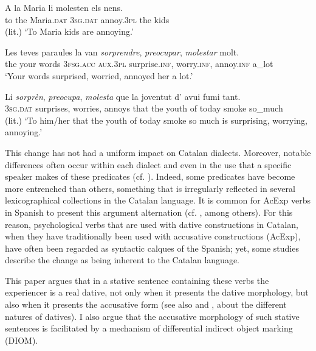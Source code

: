 \documentclass[output=paper,colorlinks,citecolor=brown,modfonts,nonflat]{langsci/langscibook}
\begin{document}
 \ex \label{ex:royo:1b}
 \gll A la Maria li molesten els nens.\\
 to the Maria.\textsc{dat} \textsc{3sg.dat} annoy.\textsc{3pl} the kids\\
 \glt  (lit.) ‘To Maria kids are annoying.’
 \z
 \z
 
\ea%
 \label{ex:royo:2} \citealt[77]{CabréMateu1998}
 \ea \label{ex:royo:2a}
 \gll Les teves paraules la van \emph{sorprendre}, \emph{preocupar}, \emph{molestar} molt.\\
the  your words     \textsc{3fsg.acc} \textsc{aux.3pl} surprise.\textsc{inf}, worry.\textsc{inf},  annoy.\textsc{inf} a\_lot\\
 \glt ‘Your words surprised, worried, annoyed her a lot.’ 
 
 \ex \label{ex:royo:2b}
 \gll Li \emph{sorprèn}, \emph{preocupa}, \emph{molesta} que la joventut d’ avui fumi tant.\\
\textsc{3sg.dat} surprises, worries,     annoys  that the youth     of today smoke so\_much\\
 \glt	(lit.) ‘To him/her that the youth of today smoke so much is surprising, worrying, annoying.’
 
 \z
 \z
 

This change has not had a uniform impact on Catalan dialects. Moreover, notable differences often occur within each dialect and even in the use that a specific speaker makes of these predicates (cf. \citealt[70]{CabréMateu1998}). Indeed, some predicates have become more entrenched than others, something that is irregularly reflected in several lexicographical collections in the Catalan language. It is common for AcExp verbs in Spanish to present this argument alternation (cf. \citealt{MendivilGiro2005, MarínMcNally2011}, among others). For this reason, psychological verbs that are used with dative constructions in Catalan, when they have traditionally been used with accusative constructions (AcExp), have often been regarded as syntactic calques of the Spanish; yet, some studies describe the change as being inherent to the Catalan language.

This paper argues that in a stative sentence containing these verbs the experiencer is a real dative, not only when it presents the dative morphology, but also when it presents the accusative form (see also  and , about the different natures of datives). I also argue that the accusative morphology of such stative sentences is facilitated by a mechanism of differential indirect object marking (DIOM).
\end{document}
